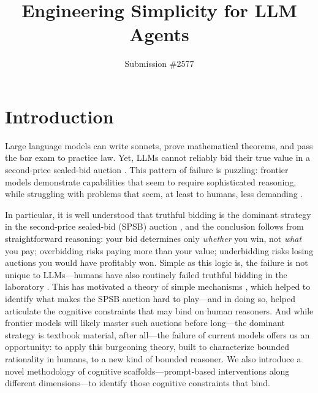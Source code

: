 \documentclass[format=acmsmall, review=false]{acmart}
\title[Engineering Simplicity for LLM Agents]{Engineering Simplicity for LLM Agents}
\author{Submission \#2577}
\begin{document}
\begin{titlepage}
\maketitle
\vspace{1cm}
\setcounter{tocdepth}{2}
\tableofcontents
\end{titlepage}

\section{Introduction} \label{sec:introduction}

Large language models can write sonnets, prove mathematical theorems, and pass the bar exam to practice law. Yet, LLMs cannot reliably bid their true value in a second-price sealed-bid auction \citep{zhu2024evidence}. This pattern of failure is puzzling: frontier models demonstrate capabilities that seem to require sophisticated reasoning, while struggling with problems that seem, at least to humans, less demanding \citep{chollet2019measure}.

In particular, it is well understood that truthful bidding is the dominant strategy in the second-price sealed-bid (SPSB) auction \citep{vickrey1961counterspeculation}, and the conclusion follows from straightforward reasoning: your bid determines only \textit{whether} you win, not \textit{what} you pay; overbidding risks paying more than your value; underbidding risks losing auctions you would have profitably won. Simple as this logic is, the failure is not unique to LLMs---humans have also routinely failed truthful bidding in the laboratory \citep{kagel1993independent, kagel1995individual}. This has motivated a theory of simple mechanisms \citep{li2017obviously}, which helped to identify what makes the SPSB auction hard to play---and in doing so, helped articulate the cognitive constraints that may bind on human reasoners. And while frontier models will likely master such auctions before long---the dominant strategy is textbook material, after all---the failure of current models offers us an opportunity: to apply this burgeoning theory, built to characterize bounded rationality in humans, to a new kind of bounded reasoner. We also introduce a novel methodology of cognitive scaffolds---prompt-based interventions along different dimensions---to identify those cognitive constraints that bind.
\end{document}
